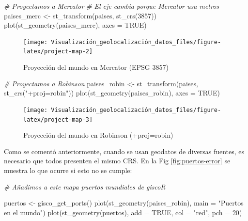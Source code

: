 \documentclass[
]{report}
\newenvironment{Shaded}{\begin{snugshade}}{\end{snugshade}}
\newcommand{\AttributeTok}[1]{\textcolor[rgb]{0.77,0.63,0.00}{#1}}
\newcommand{\CommentTok}[1]{\textcolor[rgb]{0.56,0.35,0.01}{\textit{#1}}}
\newcommand{\ConstantTok}[1]{\textcolor[rgb]{0.00,0.00,0.00}{#1}}
\newcommand{\DecValTok}[1]{\textcolor[rgb]{0.00,0.00,0.81}{#1}}
\newcommand{\FunctionTok}[1]{\textcolor[rgb]{0.00,0.00,0.00}{#1}}
\newcommand{\NormalTok}[1]{#1}
\newcommand{\OtherTok}[1]{\textcolor[rgb]{0.56,0.35,0.01}{#1}}
\newcommand{\StringTok}[1]{\textcolor[rgb]{0.31,0.60,0.02}{#1}}
\theoremstyle{definition}
\theoremstyle{definition}
\theoremstyle{definition}
\theoremstyle{definition}
\theoremstyle{remark}
\begin{document}
\begin{Shaded}
\begin{Highlighting}[]

\CommentTok{\# Proyectamos a Mercator}
\CommentTok{\# El eje cambia porque Mercator usa metros}
\NormalTok{paises\_merc }\OtherTok{\textless{}{-}} \FunctionTok{st\_transform}\NormalTok{(paises, }\FunctionTok{st\_crs}\NormalTok{(}\DecValTok{3857}\NormalTok{))}
\FunctionTok{plot}\NormalTok{(}\FunctionTok{st\_geometry}\NormalTok{(paises\_merc), }\AttributeTok{axes =} \ConstantTok{TRUE}\NormalTok{)}
\end{Highlighting}
\end{Shaded}

\begin{figure}

{\centering \texttt{[image: Visualización\_geolocalización\_datos\_files/figure-latex/project-map-2]} 

}

\caption{Proyección del mundo en Mercator (EPSG 3857)}\label{fig:project-map-2}
\end{figure}

\begin{Shaded}
\begin{Highlighting}[]
\CommentTok{\# Proyectamos a Robinson}
\NormalTok{paises\_robin }\OtherTok{\textless{}{-}} \FunctionTok{st\_transform}\NormalTok{(paises, }\FunctionTok{st\_crs}\NormalTok{(}\StringTok{"+proj=robin"}\NormalTok{))}
\FunctionTok{plot}\NormalTok{(}\FunctionTok{st\_geometry}\NormalTok{(paises\_robin), }\AttributeTok{axes =} \ConstantTok{TRUE}\NormalTok{)}
\end{Highlighting}
\end{Shaded}

\begin{figure}

{\centering \texttt{[image: Visualización\_geolocalización\_datos\_files/figure-latex/project-map-3]} 

}

\caption{Proyección del mundo en Robinson (+proj=robin)}\label{fig:project-map-3}
\end{figure}

Como se comentó anteriormente, cuando se usan geodatos de diversas fuentes, es
necesario que todos presenten el mismo CRS. En la Fig \ref{fig:puertos-error}
se muestra lo que ocurre si esto no se cumple:

\begin{Shaded}
\begin{Highlighting}[]
\CommentTok{\# Añadimos a este mapa puertos mundiales de giscoR}

\NormalTok{puertos }\OtherTok{\textless{}{-}} \FunctionTok{gisco\_get\_ports}\NormalTok{()}
\FunctionTok{plot}\NormalTok{(}\FunctionTok{st\_geometry}\NormalTok{(paises\_robin), }\AttributeTok{main =} \StringTok{"Puertos en el mundo"}\NormalTok{)}
\FunctionTok{plot}\NormalTok{(}\FunctionTok{st\_geometry}\NormalTok{(puertos), }\AttributeTok{add =} \ConstantTok{TRUE}\NormalTok{, }\AttributeTok{col =} \StringTok{"red"}\NormalTok{, }\AttributeTok{pch =} \DecValTok{20}\NormalTok{)}
\end{Highlighting}
\end{Shaded}
\end{document}
